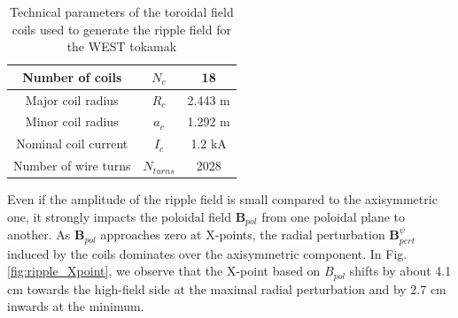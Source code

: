 \begin{table}[H]
	\centering
	\begin{tabular}{|c||c|c|}
		\hline
		Number of coils & $N_c$ & 18 \\
		\hline
		Major coil radius & $R_c$ & 2.443 m\\
		\hline
		Minor coil radius & $a_c$ & 1.292 m\\
		\hline
		Nominal coil current & $I_c$ & 1.2 kA \\
		\hline
		Number of wire turns & $N_{turns}$ & 2028 \\
		\hline        
	\end{tabular}
	\caption[Technical parameters of the toroidal field coils used to generate the ripple field for the WEST tokamak]{Technical parameters of the toroidal field coils used to generate the ripple field for the WEST tokamak}
	\label{tab:coilParameters}
\end{table}

Even if the amplitude of the ripple field is small compared to the axisymmetric one, it strongly impacts the poloidal field $\textbf{B}_{pol}$ from one poloidal plane to another. As $\textbf{B}_{pol}$ approaches zero at X-points, the radial perturbation $\textbf{B}_{pert}^{\psi}$ induced by the coils dominates over the axisymmetric component. In Fig. \ref{fig:ripple_Xpoint}, we observe that the X-point based on $B_{pol}$ shifts by about 4.1 cm towards the high-field side at the maximal radial perturbation and by 2.7 cm inwards at the minimum. \newline 


